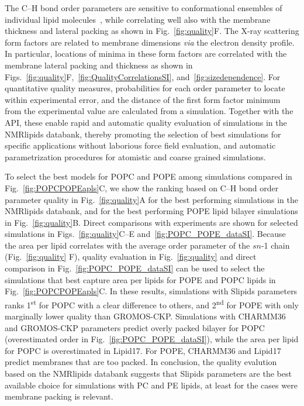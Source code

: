 \documentclass[fleqn,10pt]{wlscirep}
\begin{document}
The C--H bond order parameters are sensitive to conformational ensembles of individual lipid molecules~\cite{ollila16}, while correlating well also with the membrane thickness and lateral packing as shown in Fig.~\ref{fig:quality}F. The X-ray scattering form factors are related to membrane dimensions \textit{via} the electron density profile. In particular, locations of minima in these form factors are correlated with the membrane lateral packing and thickness as shown in Figs.~\ref{fig:quality}F,~\ref{fig:QualityCorrelationsSI}, and~\ref{fig:sizedependence}. For quantitative quality measures, probabilities for each order parameter to locate within experimental error, and the distance of the first form factor minimum from the experimental value are calculated from a simulation.
Together with the API, these enable rapid and automatic quality evaluation of simulations in the NMRlipids databank, thereby promoting the selection of best simulations for specific applications without laborious force field evaluation, and automatic parametrization procedures for atomistic and coarse grained simulations.

To select the best models for POPC and POPE among simulations compared in Fig.~\ref{fig:POPCPOPEapls}C, we show the ranking based on C--H bond order parameter quality in Fig.~\ref{fig:quality}A for the best performing simulations in the NMRlipids databank, and for the best performing POPE lipid bilayer simulations in Fig.~\ref{fig:quality}B. Direct comparisons with experiments are shown for selected simulations in Figs.~\ref{fig:quality}C--E and~\ref{fig:POPC_POPE_dataSI}. 
Because the area per lipid correlates with the average order parameter of the $\textit{sn}$-1 chain (Fig.~\ref{fig:quality} F), quality evaluation in Fig.~\ref{fig:quality} and direct comparison in Fig.~\ref{fig:POPC_POPE_dataSI} can be used to select the simulations that best capture area per lipids for POPE and POPC lipids in Fig.~\ref{fig:POPCPOPEapls}C. In these results, simulations with Slipids parameters ranks 1\textsuperscript{st} for POPC with a clear difference to others, and 2\textsuperscript{nd} for POPE with only marginally lower quality than GROMOS-CKP. Simulations with CHARMM36 and GROMOS-CKP parameters predict overly packed bilayer for POPC (overestimated order in Fig.~\ref{fig:POPC_POPE_dataSI}), while the area per lipid for POPC is overestimated in Lipid17. For POPE, CHARMM36 and Lipid17 predict membranes that are too packed. In conclusion, the quality evalution based on the NMRlipids databank suggests that Slipids parameters are the best available choice for simulations with PC and PE lipids, at least for the cases were membrane packing is relevant.
\end{document}
